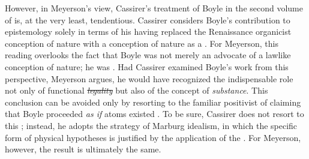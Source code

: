 \documentclass[submitted,12pt]{article}
\providecommand{\DIFadd}[1]{{\protect\color{blue}\uwave{#1}}} %
\providecommand{\DIFdel}[1]{{\protect\color{red}\sout{#1}}}                      %
\providecommand{\DIFaddbegin}{} %
\providecommand{\DIFaddend}{} %
\providecommand{\DIFdelbegin}{} %
\providecommand{\DIFdelend}{} %
\begin{document}
However, in Meyerson's view, Cassirer's treatment of Boyle in the second volume of \EPt is, at the very least, tendentious. Cassirer considers Boyle's contribution to epistemology solely in terms of his having replaced the Renaissance organicist conception of nature with a conception of nature as a  \citep[312--313]{Cassirer1907b}. For Meyerson, this reading overlooks the fact that Boyle was not merely an advocate of a lawlike conception of nature; he was  \citep[122--123]{Meyerson1911}. Had Cassirer examined Boyle's work from this perspective, Meyerson argues, he would have recognized the indispensable role not only of functional \emph{\DIFdelbegin \DIFdel{legality}\DIFdelend \DIFaddbegin \DIFadd{lawfulness}\DIFaddend } \DIFaddbegin {} \DIFaddend but also of the concept of \emph{substance}. This conclusion can be avoided only by resorting to the familiar positivist  of claiming that Boyle proceeded \textit{as if} atoms existed \citep[123]{Meyerson1911}. To be sure, Cassirer does not resort to this ; instead, he adopts the strategy of Marburg idealism, in which the specific form of physical hypotheses is justified by the application of the  \citep[123]{Meyerson1911}. For Meyerson, however, the result is ultimately the same.
\end{document}
